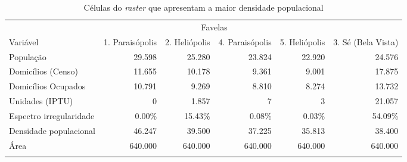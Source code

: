 \begin{table}[h]
\caption{Células do \textit{raster} que apresentam a maior densidade populacional}
\centering
\fontsize{9.8pt}{11.7pt}\selectfont
\begin{tabular*}{.975\linewidth}{@{\extracolsep{\fill}}lrrrrr}
\toprule
 & \multicolumn{4}{c}{Favelas} &  \\ 
\cmidrule(lr){2-5}
Variável & 1. Paraisópolis & 2. Heliópolis  & 4. Paraisópolis & 5. Heliópolis & 3. Sé (Bela Vista) \\ 
\midrule\addlinespace[2.5pt]
População & 29.598 & 25.280 & 23.824 & 22.920 & 24.576 \\ 
Domicílios (Censo) & 11.655 & 10.178 & 9.361 & 9.001 & 17.875 \\ 
Domicílios Ocupados & 10.791 & 9.269 & 8.810 & 8.274 & 13.732 \\ 
Unidades (IPTU) & 0 & 1.857 & 7 & 3 & 21.057 \\ 
Espectro irregularidade & 0.00\% & 15.43\% & 0.08\% & 0.03\% & 54.09\% \\ 
Densidade populacional & 46.247 & 39.500 & 37.225 & 35.813 & 38.400 \\ 
Área & 640.000 & 640.000 & 640.000 & 640.000 & 640.000 \\ 
\bottomrule
\label{tab:top5}

\end{tabular*}
\end{table}

